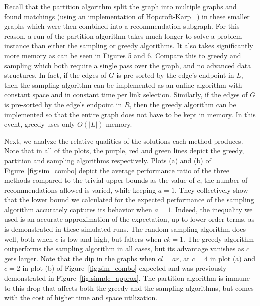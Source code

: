 Recall that the partition algorithm split the graph into multiple graphs
and found matchings (using an implementation of Hopcroft-Karp ~\cite{HopcroftKarp})
in these smaller graphs which were then combined into
a recommendation subgraph. For this reason, a run of the partition
algorithm takes much longer to solve a problem instance than either the
sampling or greedy algorithms. It also takes significantly more memory as can be seen in Figures 5 and 6.
Compare this to greedy and sampling which both require a single pass over
the graph, and no advanced data structures. In fact, if the edges
of $G$ is pre-sorted by the edge's endpoint in $L$, then the sampling algorithm can be
implemented as an online algorithm with constant space and in constant time
per link selection. Similarly, if the edges of $G$
is pre-sorted by the edge's endpoint in $R$, then the greedy algorithm can
be implemented so that the entire graph does not have to be kept in memory. In this
event, greedy uses only $O(|L|)$ memory. \vs

Next, we analyze the relative qualities of the solutions each method
produces. Note that in all of the plots, the purple, red and green lines depict the 
greedy, partition and sampling algorithms respectively.
 Plots (a) and (b) of Figure~\ref{fig:sim_combo} depict the
average performance ratio of the three methods compared to the trivial
upper bounds as the value of $c$, the number of recommendations
allowed is varied, while keeping $a = 1$.
They collectively show that the lower bound we calculated for the
expected performance of the sampling algorithm accurately captures its
behavior when $a=1$. Indeed, the inequality
we used is an accurate approximation of the expectation, up to lower
order terms, as is demonstrated in these simulated runs.  The random
sampling algorithm does well, both when $c$ is low and high, but
falters when $ck=1$. The greedy algorithm outperforms the
sampling algorithm in all cases, but its advantage vanishes as
$c$ gets larger. Note that the dip in the graphs when $cl=ar$, at
$c=4$ in plot (a) and $c=2$ in plot (b) of Figure~\ref{fig:sim_combo}
expected and was previously demonstrated in
Figure~\ref{fig:simple_approx}.  The partition algorithm is immune to
this drop that affects both the greedy and the sampling algorithms,
but comes with the cost of higher time and space utilization.\vs

